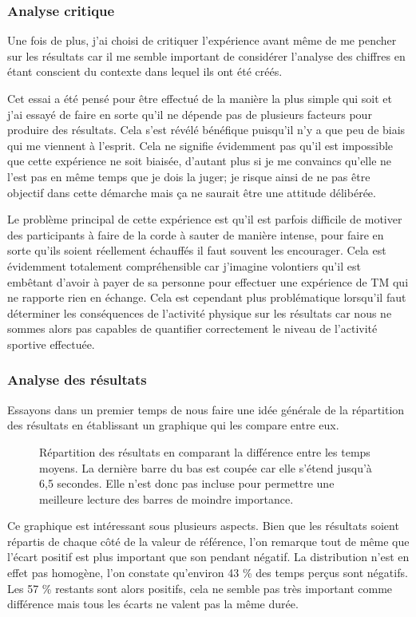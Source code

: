 \documentclass[12pt,fleqn,oneside,french,openany]{book} %
\begin{document}
\subsubsection{Analyse critique} \label{sssec:analyseCrit2.2}
Une fois de plus, j'ai choisi de critiquer l'expérience avant même de me pencher sur les résultats car il me semble important de considérer l'analyse des chiffres en étant conscient du contexte dans lequel ils ont été créés. 

Cet essai a été pensé pour être effectué de la manière la plus simple qui soit et j'ai essayé de faire en sorte qu'il ne dépende pas de plusieurs facteurs pour produire des résultats. Cela s'est révélé bénéfique puisqu'il n'y a que peu de biais qui me viennent à l'esprit. Cela ne signifie évidemment pas qu'il est impossible que cette expérience ne soit biaisée, d'autant plus si je me convaincs qu'elle ne l'est pas en même temps que je dois la juger; je risque ainsi de ne pas être objectif dans cette démarche mais ça ne saurait être une attitude délibérée.

Le problème principal de cette expérience est qu'il est parfois difficile de motiver des participants à faire de la corde à sauter de manière intense, pour faire en sorte qu'ils soient réellement échauffés il faut souvent les encourager. Cela est évidemment totalement compréhensible car j'imagine volontiers qu'il est embêtant d'avoir à payer de sa personne pour effectuer une expérience de TM qui ne rapporte rien en échange. Cela est cependant plus problématique lorsqu'il faut déterminer les conséquences de l'activité physique sur les résultats car nous ne sommes alors pas capables de quantifier correctement le niveau de l'activité sportive effectuée.

\subsubsection{Analyse des résultats} \label{sssec:analyseResult2.2}

Essayons dans un premier temps de nous faire une idée générale de la répartition des résultats en établissant un graphique qui les compare entre eux.

\begin{figure}[htp] %
	\caption{Répartition des résultats en comparant la différence entre les temps moyens. La dernière barre du bas est coupée car elle s'étend jusqu'à 6,5 secondes. Elle n'est donc pas incluse pour permettre une meilleure lecture des barres de moindre importance.}
\end{figure}
Ce graphique est intéressant sous plusieurs aspects. Bien que les résultats soient répartis de chaque côté de la valeur de référence, l'on remarque tout de même que l'écart positif est plus important que son pendant négatif. La distribution n'est en effet pas homogène, l'on constate qu'environ 43 \% des temps perçus sont négatifs. Les 57 \% restants sont alors positifs, cela ne semble pas très important comme différence mais tous les écarts ne valent pas la même durée.
\end{document}
